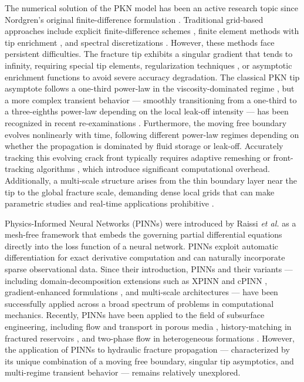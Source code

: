 \documentclass[a4paper,fleqn]{cas-sc}
\begin{document}
The numerical solution of the PKN model has been an active research
topic since Nordgren's original finite-difference formulation
\cite{Nordgren1972}. Traditional grid-based approaches include explicit
finite-difference schemes \cite{Kemp1990}, finite element methods with
tip enrichment \cite{Garikapati2017}, and spectral discretizations
\cite{Peirce2014}. However, these methods face persistent difficulties.
The fracture tip exhibits a singular gradient that tends to infinity,
requiring special tip elements, regularization techniques
\cite{Linkov2011}, or asymptotic enrichment functions
\cite{Garikapati2017} to avoid severe accuracy degradation. The
classical PKN tip asymptote follows a one-third power-law in the
viscosity-dominated regime \cite{Nordgren1972,Kemp1990}, but a more
complex transient behavior --- smoothly transitioning from a one-third
to a three-eighths power-law depending on the local leak-off intensity
--- has been recognized in recent re-examinations
\cite{Linkov2015,Detournay2016}. Furthermore, the moving free boundary
evolves nonlinearly with time, following different power-law regimes
depending on whether the propagation is dominated by fluid storage or
leak-off. Accurately tracking this evolving crack front typically
requires adaptive remeshing or front-tracking algorithms
\cite{Peirce2014}, which introduce significant computational overhead.
Additionally, a multi-scale structure arises from the thin boundary
layer near the tip to the global fracture scale, demanding dense local
grids that can make parametric studies and real-time applications
prohibitive \cite{Detournay2016}.

Physics-Informed Neural Networks (PINNs) were introduced by Raissi
\emph{et al.} \cite{Raissi2019} as a mesh-free framework that embeds
the governing partial differential equations directly into the loss
function of a neural network. PINNs exploit automatic differentiation
for exact derivative computation and can naturally incorporate sparse
observational data. Since their introduction, PINNs and their variants
--- including domain-decomposition extensions such as XPINN
\cite{Jagtap2020} and cPINN \cite{Jagtap2020b}, gradient-enhanced
formulations \cite{Yu2022}, and multi-scale architectures
\cite{Moseley2023} --- have been successfully applied across a broad
spectrum of problems in computational mechanics. Recently, PINNs have
been applied to the field of subsurface engineering, including flow and
transport in porous media \cite{Hassan2024}, history-matching in
fractured reservoirs \cite{Ali2025}, and two-phase flow in heterogeneous
formations \cite{Wang2024}. However, the application of PINNs to
hydraulic fracture propagation --- characterized by its unique
combination of a moving free boundary, singular tip asymptotics, and
multi-regime transient behavior --- remains relatively unexplored.
\end{document}
